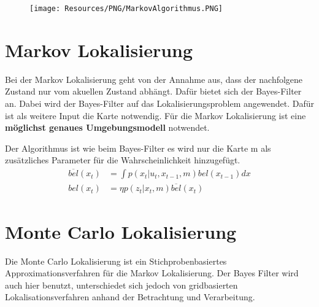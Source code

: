 {
\begin{figure}
	\texttt{[image: Resources/PNG/MarkovAlgorithmus.PNG]}
\end{figure}
\section{Markov Lokalisierung}
Bei der Markov Lokalisierung geht von der Annahme aus, dass der nachfolgene
Zustand nur vom akuellen Zustand abhängt. Dafür bietet sich der Bayes-Filter an.
Dabei wird der Bayes-Filter auf das Lokalisierungsproblem angewendet. Dafür ist
als weitere Input die Karte notwendig. Für die Markov Lokalisierung ist eine
\textbf{möglichst genaues Umgebungsmodell} notwendet.

Der Algorithmus ist wie beim Bayes-Filter es wird nur die Karte m als
zusätzliches Parameter für die Wahrscheinlichkeit hinzugefügt.
\begin{align*}
	\overline{bel}(x_t) &= \int p(x_t | u_t, x_{t-1}, m)bel(x_{t-1})dx \\
	bel(x_t) &= \eta p(z_t | x_t, m)\overline{bel}(x_t)
\end{align*}

}

\section{Monte Carlo Lokalisierung}
Die Monte Carlo Lokalisierung ist ein Stichprobenbasiertes
Approximationsverfahren für die Markov Lokalisierung. Der Bayes Filter wird
auch hier benutzt, unterschiedet sich jedoch von gridbasierten
Lokalisationsverfahren anhand der Betrachtung und Verarbeitung.

